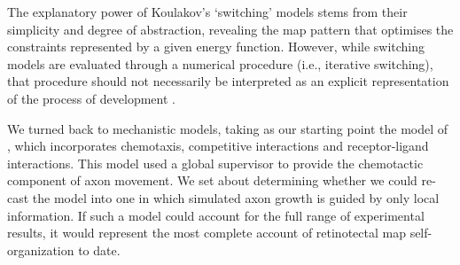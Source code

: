 \documentclass[9pt]{elife} %
\begin{document}
The explanatory power of Koulakov's `switching' models stems from their
simplicity and degree of abstraction, revealing the map pattern that optimises
the constraints represented by a given energy function. However, while
switching models are evaluated through a numerical procedure (i.e., iterative
switching), that procedure should not necessarily be interpreted as an
explicit representation of the process of development
\citep{Wilson2015}.

We turned back to mechanistic models, taking as our starting point the model of
\cite{Simpson2011}, which incorporates chemotaxis, competitive interactions
and receptor-ligand interactions. This model used a global supervisor to
provide the chemotactic component of axon movement. We set about determining
whether we could re-cast the model into one in which simulated axon growth is
guided by only local information. If such a model could account for the full
range of experimental results, it would represent the most complete account of
retinotectal map self-organization to date.


\end{document}
